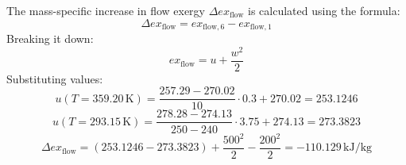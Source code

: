 The mass-specific increase in flow exergy \( \Delta ex_{\text{flow}} \) is calculated using the formula:  
\[
\Delta ex_{\text{flow}} = ex_{\text{flow},6} - ex_{\text{flow},1}
\]  
Breaking it down:  
\[
ex_{\text{flow}} = u + \frac{w^2}{2}
\]  
Substituting values:  
\[
u(T = 359.20 \, \text{K}) = \frac{257.29 - 270.02}{10} \cdot 0.3 + 270.02 = 253.1246
\]  
\[
u(T = 293.15 \, \text{K}) = \frac{278.28 - 274.13}{250 - 240} \cdot 3.75 + 274.13 = 273.3823
\]  
\[
\Delta ex_{\text{flow}} = (253.1246 - 273.3823) + \frac{500^2}{2} - \frac{200^2}{2} = -110.129 \, \text{kJ/kg}
\]